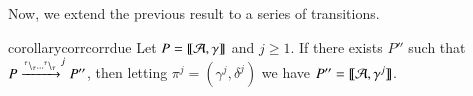 
 
 
\noindent
Now, we extend the previous result to a series of transitions.
 
 \begin{restatable}[Correctness 2]{corollary}{corrcorrdue} 
 \label{corr:corr2}
  Let $P = \llbracket{\cal A},\gamma\rrbracket$ and $j\geq 1$.
If there exists  $P''$ such that $P \xrightarrow{{}^{\tau} \backslash_{\tau}\dots {}^{\tau} \backslash_{\tau}}^{j}P''$, then letting  $\pi^j=(\gamma^j,\delta^j)$ we have
$P'' =\llbracket{\cal A},\gamma^j\rrbracket$.
 \end{restatable}


